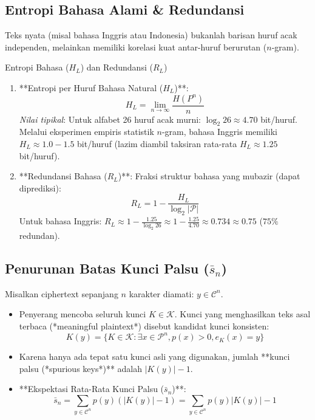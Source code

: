\documentclass[11pt,a4paper]{article}
\begin{document}
\subsection{Entropi Bahasa Alami \& Redundansi}
Teks nyata (misal bahasa Inggris atau Indonesia) bukanlah barisan huruf acak independen, melainkan memiliki korelasi kuat antar-huruf berurutan ($n$-gram).
\begin{conceptbox}{Entropi Bahasa ($H_L$) dan Redundansi ($R_L$)}
\begin{enumerate}
    \item **Entropi per Huruf Bahasa Natural ($H_L$)**:
    \begin{equation}
    \label{eq:HL_def}
    H_L = \lim_{n \to \infty} \frac{H(P^n)}{n}
    \end{equation}
    \textit{Nilai tipikal}: Untuk alfabet 26 huruf acak murni: $\log_2 26 \approx 4.70$ bit/huruf. Melalui eksperimen empiris statistik $n$-gram, bahasa Inggris memiliki $H_L \approx 1.0 - 1.5$ bit/huruf (lazim diambil taksiran rata-rata $H_L \approx 1.25$ bit/huruf).
    \item **Redundansi Bahasa ($R_L$)**:
    Fraksi struktur bahasa yang mubazir (dapat diprediksi):
    \begin{equation}
    \label{eq:RL_def}
    R_L = 1 - \frac{H_L}{\log_2 |\mathcal{P}|}
    \end{equation}
    Untuk bahasa Inggris: $R_L \approx 1 - \frac{1.25}{\log_2 26} \approx 1 - \frac{1.25}{4.70} \approx 0.734 \approx 0.75$ ($75\%$ redundan).
\end{enumerate}
\end{conceptbox}

\subsection{Penurunan Batas Kunci Palsu ($\bar{s}_n$)}
Misalkan ciphertext sepanjang $n$ karakter diamati: $y \in \mathcal{C}^n$.
\begin{itemize}
    \item Penyerang mencoba seluruh kunci $K \in \mathcal{K}$. Kunci yang menghasilkan teks asal terbaca (*meaningful plaintext*) disebut kandidat kunci konsisten:
    \begin{equation}
    K(y) = \{K \in \mathcal{K} : \exists x \in \mathcal{P}^n, p(x) > 0, e_K(x) = y\}
    \end{equation}
    \item Karena hanya ada tepat satu kunci asli yang digunakan, jumlah **kunci palsu (*spurious keys*)** adalah $|K(y)| - 1$.
    \item **Ekspektasi Rata-Rata Kunci Palsu ($\bar{s}_n$)**:
    \begin{equation}
    \bar{s}_n = \sum_{y \in \mathcal{C}^n} p(y)(|K(y)| - 1) = \sum_{y \in \mathcal{C}^n} p(y)|K(y)| - 1
    \end{equation}
\end{itemize}
\end{document}
